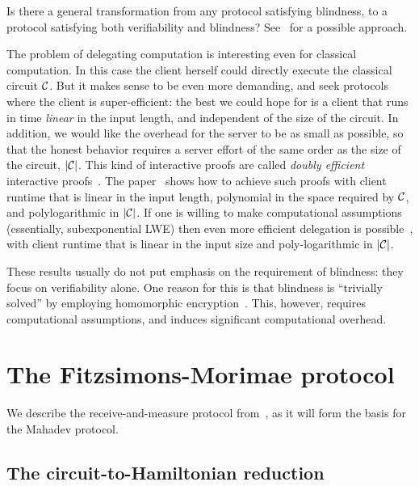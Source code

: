 \begin{oq}
Is there a general transformation from any protocol satisfying blindness, to a protocol satisfying both verifiability and blindness? See~\cite{kashefi2017quantum} for a possible approach. 
\end{oq}

\begin{remark}
The problem of delegating computation is interesting even for classical computation. In this case the client herself could directly execute the classical circuit $\mathcal{C}$. But it makes sense to be even more demanding, and seek protocols where the client is super-efficient: the best we could hope for is a client that runs in time \emph{linear} in the input length, and independent of the size of the circuit. In addition, we would like the overhead for the server to be as small as possible, so that the honest behavior requires a server effort of the same order as the size of the circuit, $|\mathcal{C}|$. This kind of interactive proofs are called \emph{doubly efficient} interactive proofs~\cite{goldwasser2008delegating}. The paper~\cite{reingold2016constant} shows how to achieve such proofs with client runtime that is linear in the input length, polynomial in the space required by $\mathcal{C}$, and polylogarithmic in $|\mathcal{C}|$. If one is willing to make computational assumptions (essentially, subexponential LWE) then even more efficient delegation is possible~\cite{kalai2014delegate}, with client runtime that is linear in the input size and poly-logarithmic in $|\mathcal{C}|$. 

These results usually do not put emphasis on the requirement of blindness: they focus on verifiability alone. One reason for this is that blindness is ``trivially solved'' by employing homomorphic encryption~\cite{gentry2009fully}. This, however, requires computational assumptions, and induces significant computational overhead. 
\end{remark}


\section{The Fitzsimons-Morimae protocol}
\label{sec:fm}

We describe the receive-and-measure protocol from~\cite{morimae2016post}, as it will form the basis for the Mahadev protocol. 


\subsection{The circuit-to-Hamiltonian reduction}
\label{sec:certificates-q}

